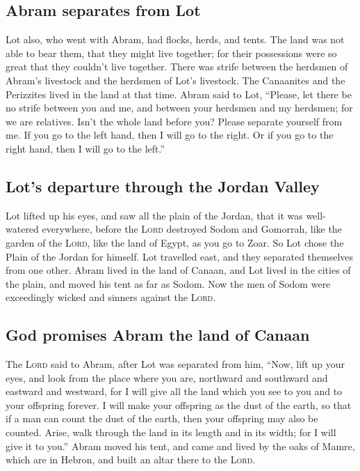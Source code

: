 \hypertarget{abram-separates-from-lot}{%
\subsection{Abram separates from Lot}\label{abram-separates-from-lot}}

 Lot also, who went with Abram, had flocks, herds, and
tents.  The land was not able to bear them, that they
might live together; for their possessions were so great that they
couldn't live together.  There was strife between the
herdsmen of Abram's livestock and the herdsmen of Lot's livestock. The
Canaanites and the Perizzites lived in the land at that time.
 Abram said to Lot, ``Please, let there be no strife
between you and me, and between your herdsmen and my herdsmen; for we
are relatives.  Isn't the whole land before you? Please
separate yourself from me. If you go to the left hand, then I will go to
the right. Or if you go to the right hand, then I will go to the left.''

\hypertarget{lots-departure-through-the-jordan-valley}{%
\subsection{Lot's departure through the Jordan
Valley}\label{lots-departure-through-the-jordan-valley}}

 Lot lifted up his eyes, and saw all the plain of the
Jordan, that it was well-watered everywhere, before the \textsc{Lord}
destroyed Sodom and Gomorrah, like the garden of the \textsc{Lord}, like
the land of Egypt, as you go to Zoar.  So Lot chose the
Plain of the Jordan for himself. Lot travelled east, and they separated
themselves from one other.  Abram lived in the land of
Canaan, and Lot lived in the cities of the plain, and moved his tent as
far as Sodom.  Now the men of Sodom were exceedingly
wicked and sinners against the \textsc{Lord}.

\hypertarget{god-promises-abram-the-land-of-canaan}{%
\subsection{God promises Abram the land of
Canaan}\label{god-promises-abram-the-land-of-canaan}}

 The \textsc{Lord} said to Abram, after Lot was separated
from him, ``Now, lift up your eyes, and look from the place where you
are, northward and southward and eastward and westward, 
for I will give all the land which you see to you and to your offspring
forever.  I will make your offspring as the dust of the
earth, so that if a man can count the dust of the earth, then your
offspring may also be counted.  Arise, walk through the
land in its length and in its width; for I will give it to you.''
 Abram moved his tent, and came and lived by the oaks of
Mamre, which are in Hebron, and built an altar there to the
\textsc{Lord}.


